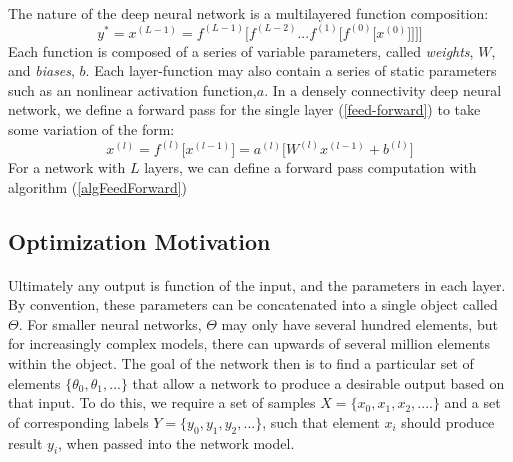 \documentclass[12pt,letterpaper]{article}
\begin{document}
\paragraph*{}The nature of the deep neural network is a multilayered function composition:
\begin{equation}
\label{DNN Composition}
y^* = x^{(L-1)} = f^{(L-1)}\big[ f^{(L-2)}...f^{(1)}\big[f^{(0)}\big[ x^{(0)} \big]\big]\big]\big]
\end{equation}
Each function is composed of a series of variable parameters, called \textit{weights}, $W$, and \textit{biases}, $b$. Each layer-function may also contain a series of static parameters such as an nonlinear activation function,$a$. In a densely connectivity deep neural network, we define a forward pass for the single layer (\ref{feed-forward}) to take some variation of the form:
\begin{equation}
x^{(l)} = f^{(l)}\big[x^{(l-1)}\big] = a^{(l)} \big[ W^{(l)} x^{(l-1)} + b^{(l)} \big]
\end{equation}
For a network with $L$ layers, we can define a forward pass computation with algorithm (\ref{algFeedForward})


\subsection{Optimization Motivation}

\paragraph*{}Ultimately any output is function of the input, and the parameters in each layer. By convention, these parameters can be concatenated into a single object called $\Theta$. For smaller neural networks, $\Theta$ may only have several hundred elements, but for increasingly complex models, there can upwards of several million elements within the object. The goal of the network then is to find a particular set of elements $\{ \theta_0 , \theta_1 , ... \}$ that allow a network to produce a desirable output based on that input. To do this, we require a set of samples $X = \{x_0,x_1,x_2,....\}$ and a set of corresponding labels 
$Y = \{y_0,y_1,y_2,...\}$, such that element $x_i$ should produce result $y_i$, when passed into the network model. 
\end{document}

